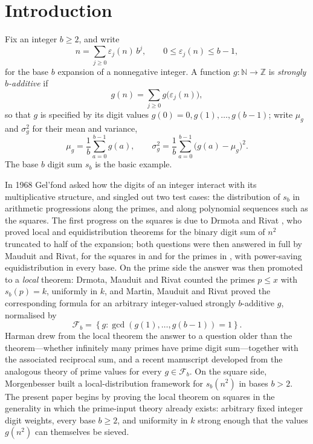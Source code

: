 \documentclass[11pt,reqno]{amsart}
\theoremstyle{plain}
\theoremstyle{definition}
\newcommand{\N}{\mathbb{N}}
\newcommand{\Z}{\mathbb{Z}}
\newcommand{\eps}{\varepsilon}
\newcommand{\1}{\mathbf 1}
\begin{document}
\section{Introduction}

Fix an integer $b\ge 2$, and write
\[
n=\sum_{j\ge 0}\eps_j(n)\,b^{j},\qquad 0\le \eps_j(n)\le b-1,
\]
for the base $b$ expansion of a nonnegative integer. A function $g\colon\N\to\Z$ is \emph{strongly $b$-additive} if
\[
g(n)=\sum_{j\ge 0}g\big(\eps_j(n)\big),
\]
so that $g$ is specified by its digit values $g(0)=0,g(1),\dots,g(b-1)$; write $\mu_g$ and $\sigma_g^2$ for their mean and variance,
\[
\mu_g=\frac1b\sum_{a=0}^{b-1}g(a),\qquad
\sigma_g^2=\frac1b\sum_{a=0}^{b-1}\big(g(a)-\mu_g\big)^2 .
\]
The base $b$ digit sum $s_b$ is the basic example.

In 1968 Gel'fond \cite{gelfond} asked how the digits of an integer interact with its multiplicative structure, and singled out two test cases: the distribution of $s_b$ in arithmetic progressions along the primes, and along polynomial sequences such as the squares. The first progress on the squares is due to Drmota and Rivat \cite{drsquares}, who proved local and equidistribution theorems for the binary digit sum of $n^2$ truncated to half of the expansion; both questions were then answered in full by Mauduit and Rivat, for the squares in \cite{mauduitrivat-squares} and for the primes in \cite{mauduitrivat}, with power-saving equidistribution in every base. On the prime side the answer was then promoted to a \emph{local} theorem: Drmota, Mauduit and Rivat \cite{dmr2009} counted the primes $p\le x$ with $s_b(p)=k$, uniformly in $k$, and Martin, Mauduit and Rivat \cite{mmr2019} proved the corresponding formula for an arbitrary integer-valued strongly $b$-additive $g$, normalised by
\begin{equation}\label{eq:gcd}
 \mathcal F_b=\left\{g:\gcd(g(1),\ldots,g(b-1))=1\right\}.
\end{equation}
Harman \cite{harman} drew from the local theorem the answer to a question older than the theorem---whether infinitely many primes have prime digit sum---together with the associated reciprocal sum, and a recent manuscript \cite{vibefrtz} developed from \cite{mmr2019} the analogous theory of prime values for every $g\in\mathcal F_b$. On the square side, Morgenbesser \cite{morgenbesser} built a local-distribution framework for $s_b(n^2)$ in bases $b>2$. The present paper begins by proving the local theorem on squares in the generality in which the prime-input theory already exists: arbitrary fixed integer digit weights, every base $b\ge2$, and uniformity in $k$ strong enough that the values $g(n^2)$ can themselves be sieved.
\end{document}
